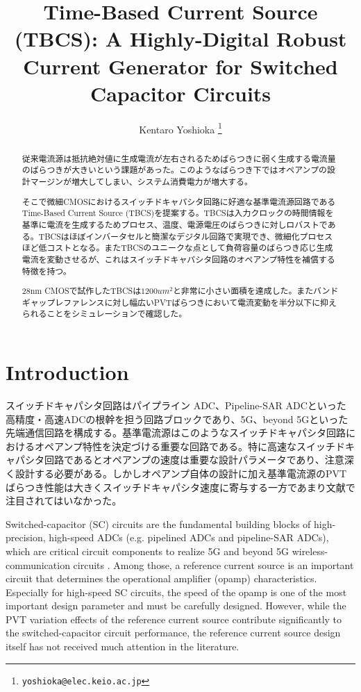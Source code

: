\documentclass[letterpaper, 10 pt, conference]{ieeeconf}  %
\title{\LARGE \bf
Time-Based Current Source (TBCS): A Highly-Digital Robust Current Generator for Switched Capacitor Circuits
}
\author{Kentaro Yoshioka%
\thanks{
        {\tt\small yoshioka@elec.keio.ac.jp}}
}
\begin{document}
\maketitle
\thispagestyle{empty}
\pagestyle{empty}

\begin{abstract}
従来電流源は抵抗絶対値に生成電流が左右されるためばらつきに弱く生成する電流量のばらつきが大きいという課題があった。このようなばらつき下ではオペアンプの設計マージンが増大してしまい、システム消費電力が増大する。

そこで微細CMOSにおけるスイッチドキャパシタ回路に好適な基準電流源回路であるTime-Based Current Source (TBCS)を提案する。TBCSは入力クロックの時間情報を基準に電流を生成するためプロセス、温度、電源電圧のばらつきに対しロバストである。TBCSはほぼインバータセルと簡潔なデジタル回路で実現でき、微細化プロセスほど低コストとなる。またTBCSのユニークな点として負荷容量のばらつき応じ生成電流を変動させるが、これはスイッチドキャパシタ回路のオペアンプ特性を補償する特徴を持つ。

28nm CMOSで試作したTBCSは$1200um^2$と非常に小さい面積を達成した。またバンドギャップレファレンスに対し幅広いPVTばらつきにおいて電流変動を半分以下に抑えられることをシミュレーションで確認した。

\end{abstract}

\section{Introduction}
スイッチドキャパシタ回路はパイプライン ADC、Pipeline-SAR ADCといった高精度・高速ADCの根幹を担う回路ブロックであり、5G、beyond 5Gといった先端通信回路を構成する\cite{ali201414, ali202012, lagos2018single, hung2020calibration}。基準電流源はこのようなスイッチドキャパシタ回路におけるオペアンプ特性を決定づける重要な回路である。特に高速なスイッチドキャパシタ回路であるとオペアンプの速度は重要な設計パラメータであり、注意深く設計する必要がある。しかしオペアンプ自体の設計に加え基準電流源のPVTばらつき性能は大きくスイッチドキャパシタ速度に寄与する一方であまり文献で注目されてはいなかった。

Switched-capacitor (SC) circuits are the fundamental building blocks of high-precision, high-speed ADCs (e.g. pipelined ADCs and pipeline-SAR ADCs), which are critical circuit components to realize 5G and beyond 5G wireless-communication circuits \cite{ali201414, ali202012, lagos2018single, hung2020calibration}. Among those, a reference current source is an important circuit that determines the operational amplifier (opamp) characteristics. Especially for high-speed SC circuits, the speed of the opamp is one of the most important design parameter and must be carefully designed. However, while the PVT variation effects of the reference current source contribute significantly to the switched-capacitor circuit performance, the reference current source design itself has not received much attention in the literature.
\end{document}
